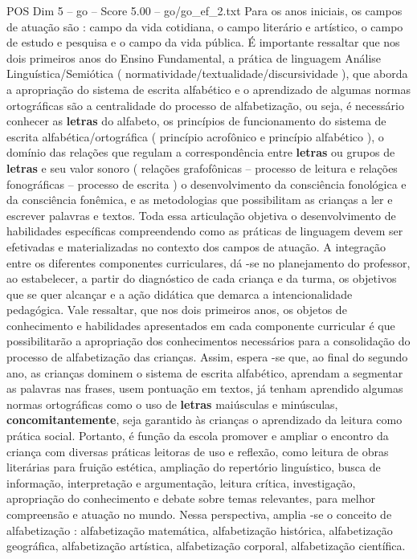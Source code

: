 \begin{textsample}{POS Dim 5 – go – Score 5.00 – go/go\_ef\_2.txt}
Para os anos iniciais, os campos de atuação são : campo da vida cotidiana, o campo literário e artístico, o campo de estudo e pesquisa e o campo da vida pública.
É importante ressaltar que nos dois primeiros anos do Ensino Fundamental, a prática de linguagem Análise Linguística/Semiótica ( normatividade/textualidade/discursividade ), que aborda a apropriação do sistema de escrita alfabético e o aprendizado de algumas normas ortográficas são a centralidade do processo de alfabetização, ou seja, é necessário conhecer as \textbf{letras} do alfabeto, os princípios de funcionamento do sistema de escrita alfabética/ortográfica ( princípio acrofônico e princípio alfabético ), o domínio das relações que regulam a correspondência entre \textbf{letras} ou grupos de \textbf{letras} e seu valor sonoro ( relações grafofônicas – processo de leitura e relações fonográficas – processo de escrita ) o desenvolvimento da consciência fonológica e da consciência fonêmica, e as metodologias que possibilitam as crianças a ler e escrever palavras e textos.
Toda essa articulação objetiva o desenvolvimento de habilidades específicas compreendendo como as práticas de linguagem devem ser efetivadas e materializadas no contexto dos campos de atuação.
A integração entre os diferentes componentes curriculares, dá -se no planejamento do professor, ao estabelecer, a partir do diagnóstico de cada criança e da turma, os objetivos que se quer alcançar e a ação didática que demarca a intencionalidade pedagógica.
Vale ressaltar, que nos dois primeiros anos, os objetos de conhecimento e habilidades apresentados em cada componente curricular é que possibilitarão a apropriação dos conhecimentos necessários para a consolidação do processo de alfabetização das crianças.
Assim, espera -se que, ao final do segundo ano, as crianças dominem o sistema de escrita alfabético, aprendam a segmentar as palavras nas frases, usem pontuação em textos, já tenham aprendido algumas normas ortográficas como o uso de \textbf{letras} maiúsculas e minúsculas, \textbf{concomitantemente}, seja garantido às crianças o aprendizado da leitura como prática social.
Portanto, é função da escola promover e ampliar o encontro da criança com diversas práticas leitoras de uso e reflexão, como leitura de obras literárias para fruição estética, ampliação do repertório linguístico, busca de informação, interpretação e argumentação, leitura crítica, investigação, apropriação do conhecimento e debate sobre temas relevantes, para melhor compreensão e atuação no mundo.
Nessa perspectiva, amplia -se o conceito de alfabetização : alfabetização matemática, alfabetização histórica, alfabetização geográfica, alfabetização artística, alfabetização corporal, alfabetização científica.

\end{textsample}
